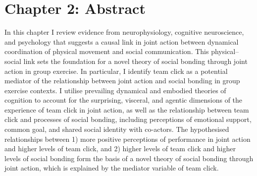 \chapter*{Chapter 2: Abstract}



In this chapter I review evidence from neurophysiology, cognitive neuroscience, and psychology that suggests a causal link in joint action between dynamical coordination of physical movement and social communication.  This physical--social link sets the foundation for a novel theory of social bonding through joint action in group exercise. In particular, I identify team click as a potential mediator of the relationship between joint action and social bonding in group exercise contexts.  I utilise prevailing dynamical and embodied theories of cognition to account for the surprising, visceral, and agentic dimensions of the experience of team click in joint action, as well as the relationship between team click and processes of social bonding, including perceptions of emotional support, common goal, and shared social identity with co-actors.  The hypothesised relationships between 1) more positive perceptions of performance in joint action and higher levels of team click, and 2) higher levels of team click and higher levels of social bonding form the basis of a novel theory of social bonding through joint action, which is explained by the mediator variable of team click.




